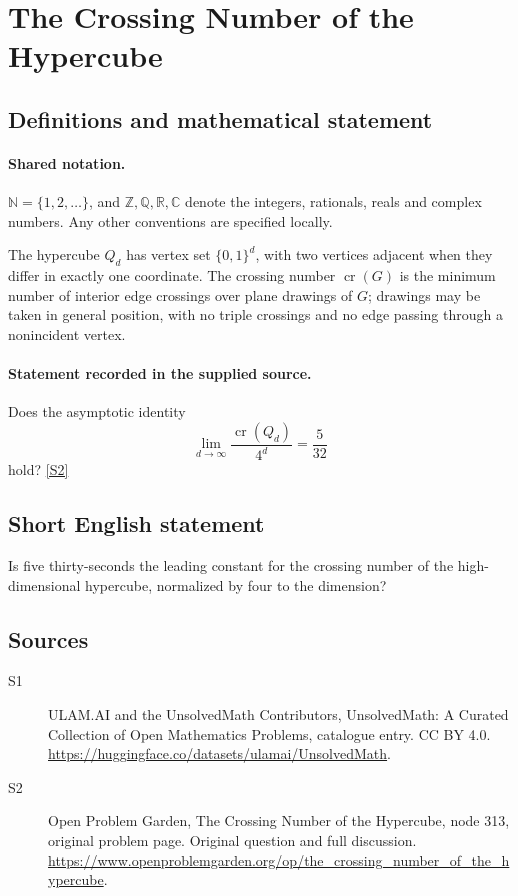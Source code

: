 \documentclass[11pt]{article}
\newcommand{\sref}[2]{\hyperlink{source:#1:#2}{[S#2]}}
\begin{document}
\section{The Crossing Number of the Hypercube}\label{statement}

\subsection{Definitions and mathematical statement}

\paragraph{Shared notation.}$\mathbb N=\{1,2,\ldots\}$, and $\mathbb Z,\mathbb Q,\mathbb R,\mathbb C$ denote the integers, rationals, reals and complex numbers. Any other conventions are specified locally.


The hypercube $Q_d$ has vertex set $\{0,1\}^d$, with two vertices adjacent when they differ in exactly one coordinate. The crossing number $\operatorname{cr}(G)$ is the minimum number of interior edge crossings over plane drawings of $G$; drawings may be taken in general position, with no triple crossings and no edge passing through a nonincident vertex.
\paragraph{Statement recorded in the supplied source.}
Does the asymptotic identity\[ \lim_{d\to\infty}\frac{\operatorname{cr}(Q_d)}{4^d}=\frac5{32} \] hold? \sref{statement}{2}
\subsection{Short English statement}
Is five thirty-seconds the leading constant for the crossing number of the high-dimensional hypercube, normalized by four to the dimension?
\subsection{Sources}
\begin{description}
\item[\hypertarget{source:statement:1}{S1}] ULAM.AI and the UnsolvedMath Contributors, UnsolvedMath: A Curated Collection of Open Mathematics Problems, catalogue entry. CC BY 4.0. \url{https://huggingface.co/datasets/ulamai/UnsolvedMath}.
\item[\hypertarget{source:statement:2}{S2}] Open Problem Garden, The Crossing Number of the Hypercube, node 313, original problem page. Original question and full discussion. \url{https://www.openproblemgarden.org/op/the_crossing_number_of_the_hypercube}.

\end{description}
\label{end:statement}
\end{document}
